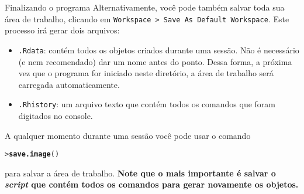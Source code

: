 \documentclass[10pt,handout]{beamer}\usepackage{graphicx, color}
\makeatletter
\newcommand{\hlfunctioncall}[1]{\textcolor[rgb]{0,0,0.545098039215686}{\textbf{#1}}}%
\newenvironment{kframe}{%
 \def\at@end@of@kframe{}%
 \ifinner\ifhmode%
  \def\at@end@of@kframe{\end{minipage}}%
  \begin{minipage}{\columnwidth}%
 \fi\fi%
 \def\FrameCommand##1{\hskip\@totalleftmargin \hskip-\fboxsep
 \colorbox{shadecolor}{##1}\hskip-\fboxsep
     \hskip-\linewidth \hskip-\@totalleftmargin \hskip\columnwidth}%
 \MakeFramed {\advance\hsize-\width
   \@totalleftmargin\z@ \linewidth\hsize
   \@setminipage}}%
 {\par\unskip\endMakeFramed%
 \at@end@of@kframe}
\newenvironment{knitrout}{}{} %
\makeatother
\begin{document}
\begin{frame}[fragile=singleslide]{Finalizando o programa}
Alternativamente, você pode também salvar toda sua área de trabalho,
clicando em \texttt{Workspace > Save As Default Workspace}. Este
processo irá gerar dois arquivos:
\begin{itemize}
\item \texttt{.Rdata}: contém todos os objetos criados durante uma
  sessão. Não é necessário (e nem recomendado) dar um nome antes do
  ponto. Dessa forma, a próxima vez que o programa for iniciado neste
  diretório, a área de trabalho será carregada automaticamente.
\item \texttt{.Rhistory}: um arquivo texto que contém todos os comandos
  que foram digitados no console.
\end{itemize}
A qualquer momento durante uma sessão você pode usar o comando
\begin{knitrout}\small
{}\color{fgcolor}\begin{kframe}
\begin{alltt}
> \hlfunctioncall{save.image}()
\end{alltt}
\end{kframe}
\end{knitrout}

para salvar a área de trabalho. \textbf{Note que o mais importante é salvar o
\emph{script} que contém todos os comandos para gerar novamente os
objetos.}
\end{frame}
\end{document}

